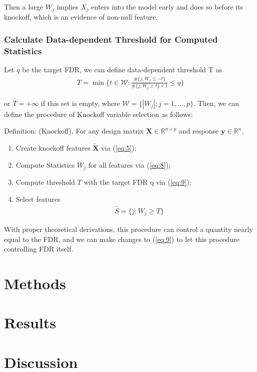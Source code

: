 \documentclass{uwstat572}
\begin{document}
Then a large $W_j$ implies $X_j$ enters into the model early and does so before its knockoff, which is an evidence of non-null feature.

\subsubsection{Calculate Data-dependent Threshold for Computed Statistics}
Let $q$ be the target FDR, we can define data-dependent threshold T as 
\begin{align}\label{eq:9}
T  = \min\{t\in\mathcal{W}: \frac{\#\{j, W_j\leq -t\}}{\#\{j, W_j\geq t\}\vee 1}\leq q \}
\end{align}

or $T=+\infty$ if this set is empty, where $\mathcal{W} = \{|W_j|;j=1,\dots,p \}$. Then, we can define the procedure of Knockoff variable selection as follows:

{\sc Definition: }(Knockoff). For any design matrix $\bm{X}\in\mathbb{R}^{n\times p}$ and response $\bm{y}\in \mathbb{R}^n$, 
\begin{enumerate}
	\item Create knockoff features $\bm{\tilde X}$ via (\ref{eq:5});
	\item Compute Statistics $W_j$ for all features via (\ref{eq:8});
	\item Compute threshold $T$ with the target FDR q via (\ref{eq:9});
	\item Select features 
	\begin{align}\label{eq:10}
	& \hat{S} =\{j: W_j\geq T\}
	\end{align}
\end{enumerate}

With proper theoretical derivations, this procedure can control a quantity nearly equal to the FDR, and we can make changes to (\ref{eq:9}) to let this procedure controlling FDR itself.


\section{Methods}

\section{Results}

\section{Discussion}


\end{document}
